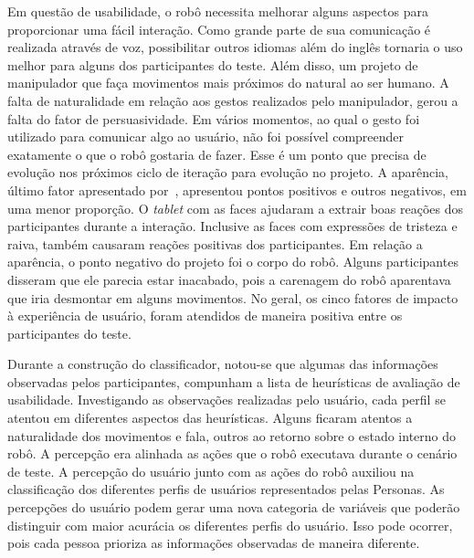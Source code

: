Em questão de usabilidade, o robô necessita melhorar alguns aspectos para proporcionar uma fácil interação. Como grande parte de sua comunicação é realizada através de voz, possibilitar outros idiomas além do inglês tornaria o uso melhor para alguns dos participantes do teste. Além disso, um projeto de manipulador que faça movimentos mais próximos do natural ao ser humano. A falta de naturalidade em relação aos gestos realizados pelo manipulador, gerou a falta do fator de persuasividade. Em vários momentos, ao qual o gesto foi utilizado para comunicar algo ao usuário, não foi possível compreender exatamente o que o robô gostaria de fazer. Esse é um ponto que precisa de evolução nos próximos ciclo de iteração para evolução no projeto. A aparência, último fator apresentado por~\textcite{hartson:2012}, apresentou pontos positivos e outros negativos, em uma menor proporção. O \emph{tablet} com as faces ajudaram a extrair boas reações dos participantes durante a interação. Inclusive as faces com expressões de tristeza e raiva, também causaram reações positivas dos participantes. Em relação a aparência, o ponto negativo do projeto foi o corpo do robô. Alguns participantes disseram que ele parecia estar inacabado, pois a carenagem do robô aparentava que iria desmontar em alguns movimentos. No geral, os cinco fatores de impacto à experiência de usuário, foram atendidos de maneira positiva entre os participantes do teste.

Durante a construção do classificador, notou-se que algumas das informações observadas pelos participantes, compunham a lista de heurísticas de avaliação de usabilidade. Investigando as observações realizadas pelo usuário, cada perfil se atentou em diferentes aspectos das heurísticas. Alguns ficaram atentos a naturalidade dos movimentos e fala, outros ao retorno sobre o estado interno do robô. A percepção era alinhada as ações que o robô executava durante o cenário de teste. A percepção do usuário junto com as ações do robô auxiliou na classificação dos diferentes perfis de usuários representados pelas Personas. As percepções do usuário podem gerar uma nova categoria de variáveis que poderão distinguir com maior acurácia os diferentes perfis do usuário. Isso pode ocorrer, pois cada pessoa prioriza as informações observadas de maneira diferente. 
